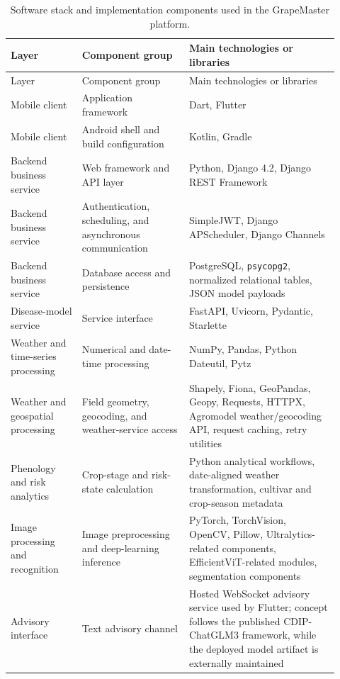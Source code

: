 \documentclass[12pt]{article}
\begin{document}
\begingroup
\setlength{\tabcolsep}{3pt}
\renewcommand{\arraystretch}{1.12}
\begin{longtable}{@{}L{0.20\linewidth} L{0.30\linewidth} L{0.42\linewidth}@{}}
\caption{Software stack and implementation components used in the GrapeMaster platform.}\label{tab:supp_software_stack}\\
\toprule
Layer & Component group & Main technologies or libraries \\
\midrule
\endfirsthead
\toprule
Layer & Component group & Main technologies or libraries \\
\midrule
\endhead
Mobile client & Application framework & Dart, Flutter \\
Mobile client & Android shell and build configuration & Kotlin, Gradle \\
Backend business service & Web framework and API layer & Python, Django 4.2, Django REST Framework \\
Backend business service & Authentication, scheduling, and asynchronous communication & SimpleJWT, Django APScheduler, Django Channels \\
Backend business service & Database access and persistence & PostgreSQL, \texttt{psycopg2}, normalized relational tables, JSON model payloads \\
Disease-model service & Service interface & FastAPI, Uvicorn, Pydantic, Starlette \\
Weather and time-series processing & Numerical and date-time processing & NumPy, Pandas, Python Dateutil, Pytz \\
Weather and geospatial processing & Field geometry, geocoding, and weather-service access & Shapely, Fiona, GeoPandas, Geopy, Requests, HTTPX, Agromodel weather/geocoding API, request caching, retry utilities \\
Phenology and risk analytics & Crop-stage and risk-state calculation & Python analytical workflows, date-aligned weather transformation, cultivar and crop-season metadata \\
Image processing and recognition & Image preprocessing and deep-learning inference & PyTorch, TorchVision, OpenCV, Pillow, Ultralytics-related components, EfficientViT-related modules, segmentation components \\
Advisory interface & Text advisory channel & Hosted WebSocket advisory service used by Flutter; concept follows the published CDIP-ChatGLM3 framework, while the deployed model artifact is externally maintained \\
\bottomrule
\end{longtable}
\endgroup
\end{document}
